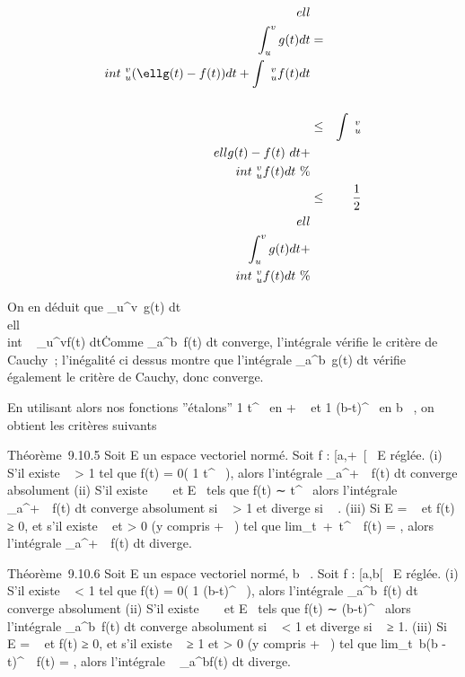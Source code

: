 \documentclass[]{article}
\begin{document}
\begin{align*}
\\ell\\\int
 _u^vg(t) dt& =&
\\int ~
_u^v(\ellg(t) - f(t)) dt +\int ~
_u^vf(t) dt\\%
\\ & \leq& \int ~
_u^v\\ellg(t) -
f(t)\ dt
+\\int ~
_u^vf(t) dt\ \%&
\\ & \leq& 1 \over 2
\\ell\\\int
 _u^vg(t) dt
+\\int ~
_u^vf(t) dt\ \%&
\\ \end{align*}

On en déduit que \int  _u^v~g(t)
dt  \over
\\ell\
\\int ~
_u^vf(t) dt\. Comme
\int  _a^b~f(t) dt converge,
l'intégrale vérifie le critère de Cauchy~; l'inégalité ci dessus montre
que l'intégrale \int  _a^b~g(t) dt
vérifie également le critère de Cauchy, donc converge.

En utilisant alors nos fonctions ''étalons''  1 \over
t^\alpha~ en + \infty~ et  1 \over
(b-t)^\alpha~ en b \in {}~, on obtient les critères suivants

Théorème~9.10.5 Soit E un espace vectoriel normé. Soit f : [a,+\infty~[\rightarrow~ E
réglée. (i) S'il existe \alpha~ > 1 tel que f(t) = 0( 1
\over t^\alpha~ ), alors l'intégrale
\int  _a^+\infty~~f(t) dt converge
absolument (ii) S'il existe \alpha~ \in {}~ et \ell \in E
\diagdown\0\ tels que f(t) ∼ \ell
\over t^\alpha~ alors l'intégrale
\int  _a^+\infty~~f(t) dt converge
absolument si \alpha~ > 1 et diverge si \alpha~ . (iii) Si E = ~ et
f(t) ≥ 0, et s'il existe \alpha~ \leq 1 et \ell > 0 (y compris + \infty~) tel
que lim_t\rightarrow~+\infty~t^\alpha~~f(t) = \ell,
alors l'intégrale \int  _a^+\infty~~f(t)
dt diverge.

Théorème~9.10.6 Soit E un espace vectoriel normé, b \in {}~. Soit f :
[a,b[\rightarrow~ E réglée. (i) S'il existe \alpha~ < 1 tel que f(t) = 0(
1 \over (b-t)^\alpha~ ), alors l'intégrale
\int  _a^b~f(t) dt converge
absolument (ii) S'il existe \alpha~ \in {}~ et \ell \in E
\diagdown\0\ tels que f(t) ∼ \ell
\over (b-t)^\alpha~ alors l'intégrale
\int  _a^b~f(t) dt converge
absolument si \alpha~ < 1 et diverge si \alpha~ ≥ 1. (iii) Si E = ~ et
f(t) ≥ 0, et s'il existe \alpha~ ≥ 1 et \ell > 0 (y compris + \infty~) tel
que lim_t\rightarrow~b(b - t)^\alpha~~f(t) =
\ell, alors l'intégrale \int ~
_a^bf(t) dt diverge.
\end{document}

